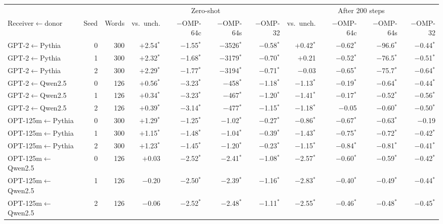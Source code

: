 \begin{tabular}{lrrrrrrrrrr}
\toprule
 & & & \multicolumn{4}{c}{Zero-shot} & \multicolumn{4}{c}{After 200 steps} \\
\cmidrule(lr){4-7}\cmidrule(lr){8-11}
Receiver$\leftarrow$donor & Seed & Words & vs.\ unch. & $-$OMP-64c & $-$OMP-64s & $-$OMP-32 & vs.\ unch. & $-$OMP-64c & $-$OMP-64s & $-$OMP-32 \\
\midrule
GPT-2$\leftarrow$Pythia & 0 & 300 & $+$2.54$^{*}$ & $-$1.55$^{*}$ & $-$3526$^{*}$ & $-$0.58$^{*}$ & $+$0.42$^{*}$ & $-$0.62$^{*}$ & $-$96.6$^{*}$ & $-$0.44$^{*}$ \\
GPT-2$\leftarrow$Pythia & 1 & 300 & $+$2.32$^{*}$ & $-$1.68$^{*}$ & $-$3179$^{*}$ & $-$0.70$^{*}$ & $+$0.21 & $-$0.52$^{*}$ & $-$76.5$^{*}$ & $-$0.51$^{*}$ \\
GPT-2$\leftarrow$Pythia & 2 & 300 & $+$2.29$^{*}$ & $-$1.77$^{*}$ & $-$3194$^{*}$ & $-$0.71$^{*}$ & $-$0.03 & $-$0.65$^{*}$ & $-$75.7$^{*}$ & $-$0.64$^{*}$ \\
GPT-2$\leftarrow$Qwen2.5 & 0 & 126 & $+$0.56$^{*}$ & $-$3.23$^{*}$ & $-$458$^{*}$ & $-$1.18$^{*}$ & $-$1.13$^{*}$ & $-$0.19$^{*}$ & $-$0.64$^{*}$ & $-$0.44$^{*}$ \\
GPT-2$\leftarrow$Qwen2.5 & 1 & 126 & $+$0.34$^{*}$ & $-$3.23$^{*}$ & $-$467$^{*}$ & $-$1.20$^{*}$ & $-$1.41$^{*}$ & $-$0.17$^{*}$ & $-$0.52$^{*}$ & $-$0.56$^{*}$ \\
GPT-2$\leftarrow$Qwen2.5 & 2 & 126 & $+$0.39$^{*}$ & $-$3.14$^{*}$ & $-$477$^{*}$ & $-$1.15$^{*}$ & $-$1.18$^{*}$ & $-$0.05 & $-$0.60$^{*}$ & $-$0.50$^{*}$ \\
OPT-125m$\leftarrow$Pythia & 0 & 300 & $+$1.29$^{*}$ & $-$1.25$^{*}$ & $-$1.02$^{*}$ & $-$0.27$^{*}$ & $-$0.86$^{*}$ & $-$0.67$^{*}$ & $-$0.63$^{*}$ & $-$0.19 \\
OPT-125m$\leftarrow$Pythia & 1 & 300 & $+$1.15$^{*}$ & $-$1.48$^{*}$ & $-$1.04$^{*}$ & $-$0.39$^{*}$ & $-$1.43$^{*}$ & $-$0.75$^{*}$ & $-$0.72$^{*}$ & $-$0.42$^{*}$ \\
OPT-125m$\leftarrow$Pythia & 2 & 300 & $+$1.23$^{*}$ & $-$1.45$^{*}$ & $-$1.20$^{*}$ & $-$0.23$^{*}$ & $-$1.15$^{*}$ & $-$0.84$^{*}$ & $-$0.81$^{*}$ & $-$0.41$^{*}$ \\
OPT-125m$\leftarrow$Qwen2.5 & 0 & 126 & $+$0.03 & $-$2.52$^{*}$ & $-$2.41$^{*}$ & $-$1.08$^{*}$ & $-$2.57$^{*}$ & $-$0.60$^{*}$ & $-$0.59$^{*}$ & $-$0.42$^{*}$ \\
OPT-125m$\leftarrow$Qwen2.5 & 1 & 126 & $-$0.20 & $-$2.50$^{*}$ & $-$2.39$^{*}$ & $-$1.16$^{*}$ & $-$2.83$^{*}$ & $-$0.40$^{*}$ & $-$0.49$^{*}$ & $-$0.44$^{*}$ \\
OPT-125m$\leftarrow$Qwen2.5 & 2 & 126 & $-$0.06 & $-$2.52$^{*}$ & $-$2.48$^{*}$ & $-$1.11$^{*}$ & $-$2.55$^{*}$ & $-$0.46$^{*}$ & $-$0.48$^{*}$ & $-$0.45$^{*}$ \\
\bottomrule
\end{tabular}
